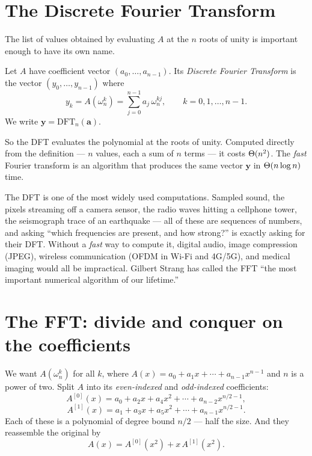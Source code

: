 \section{The Discrete Fourier Transform}

The list of values obtained by evaluating $A$ at the $n$ roots of unity is important enough to have its own name.

\begin{definition}[DFT]\label{ch29:dft-def}
Let $A$ have coefficient vector $(a_0,\dots,a_{n-1})$. Its \emph{Discrete Fourier
Transform} is the vector $(y_0,\dots,y_{n-1})$ where
\[
y_k = A(\omega_n^k) = \sum_{j=0}^{n-1} a_j \,\omega_n^{kj},\qquad k=0,1,\dots,n-1.
\]
We write $\mathbf{y} = \mathrm{DFT}_n(\mathbf{a})$.
\end{definition}

So the DFT evaluates the polynomial at the roots of unity. Computed directly
from the definition --- $n$ values, each a sum of $n$ terms --- it costs $\Theta(n^2)$.
The \emph{fast} Fourier transform is an algorithm that produces the same vector
$\mathbf{y}$ in $\Theta(n\log n)$ time.

\begin{aestheticbox}
The DFT is one of the most widely used computations. Sampled sound, the pixels
streaming off a camera sensor, the radio waves hitting a cellphone tower, the
seismograph trace of an earthquake --- all of these are sequences of numbers, and
asking ``which frequencies are present, and how strong?'' is exactly asking for
their DFT. Without a \emph{fast} way to compute it, digital audio, image
compression (JPEG), wireless communication (OFDM in Wi-Fi and 4G/5G), and medical
imaging would all be impractical. Gilbert Strang has called the FFT ``the most
important numerical algorithm of our lifetime.''
\end{aestheticbox}

\section{The FFT: divide and conquer on the coefficients}

We want $A(\omega_n^k)$ for all $k$, where
$A(x) = a_0 + a_1 x + \cdots + a_{n-1}x^{n-1}$ and $n$ is a power of two. Split $A$
into its \emph{even-indexed} and \emph{odd-indexed} coefficients:
\[
A^{[0]}(x) = a_0 + a_2 x + a_4 x^2 + \cdots + a_{n-2}x^{n/2 - 1},
\]
\[
A^{[1]}(x) = a_1 + a_3 x + a_5 x^2 + \cdots + a_{n-1}x^{n/2 - 1}.
\]
Each of these is a polynomial of degree bound $n/2$ --- half the size. And they
reassemble the original by
\[
A(x) = A^{[0]}(x^2) + x\,A^{[1]}(x^2).
\]


